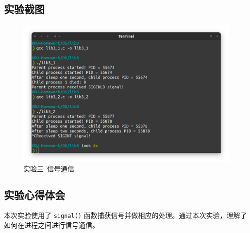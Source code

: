 \documentclass{article}
\begin{document}
		\subsection{实验截图}
			\begin{figure}[htbp]
				\centering
				\includegraphics[width=\textwidth]{lib3/Screenshot.png}
				\caption{实验三\ 信号通信}
			\end{figure}

		\subsection{实验心得体会}
			本次实验使用了 \texttt{signal()} 函数捕获信号并做相应的处理。通过本次实验，理解了如何在进程之间进行信号通信。
\end{document}
